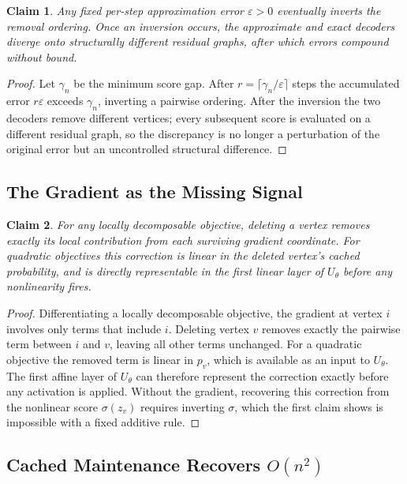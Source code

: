 \documentclass[journal,article,submit,pdftex,moreauthors]{Definitions/mdpi}
\newtheorem{claim}{Claim}[section]
\begin{document}
\begin{claim}
  Any fixed per-step approximation error $\varepsilon > 0$ eventually inverts the
  removal ordering. Once an inversion occurs, the approximate and exact decoders
  diverge onto structurally different residual graphs, after which errors compound
  without bound.
\end{claim}
\begin{proof}
  Let $\gamma_n$ be the minimum score gap. After $r = \lceil\gamma_n/\varepsilon\rceil$
  steps the accumulated error $r\varepsilon$ exceeds $\gamma_n$, inverting a pairwise
  ordering. After the inversion the two decoders remove different vertices; every
  subsequent score is evaluated on a different residual graph, so the discrepancy is
  no longer a perturbation of the original error but an uncontrolled structural
  difference.
\end{proof}

\subsection{The Gradient as the Missing Signal}

\begin{claim}
  For any locally decomposable objective, deleting a vertex removes exactly its
  local contribution from each surviving gradient coordinate. For quadratic
  objectives this correction is linear in the deleted vertex's cached probability,
  and is directly representable in the first linear layer of $U_\theta$ before any
  nonlinearity fires.
\end{claim}
\begin{proof}
  Differentiating a locally decomposable objective, the gradient at vertex $i$
  involves only terms that include $i$. Deleting vertex $v$ removes exactly the
  pairwise term between $i$ and $v$, leaving all other terms unchanged. For a
  quadratic objective the removed term is linear in $p_v$, which is available as an
  input to $U_\theta$. The first affine layer of $U_\theta$ can therefore represent
  the correction exactly before any activation is applied. Without the gradient,
  recovering this correction from the nonlinear score $\sigma(z_v)$ requires
  inverting $\sigma$, which the first claim shows is impossible with a fixed
  additive rule.
\end{proof}

\subsection{Cached Maintenance Recovers $O(n^2)$}
\end{document}
